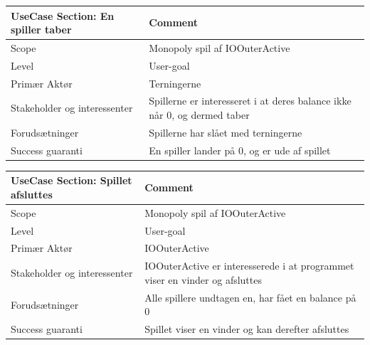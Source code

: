\begin{center}
\begin{tabular}{ | m{10em} | m{10cm}| }
        \hline
            UseCase Section: En spiller taber & Comment\\
        \hline
            Scope & Monopoly spil af IOOuterActive\\
        \hline
            Level & User-goal\\
        \hline
            Primær Aktør & Terningerne\\
        \hline
            Stakeholder og interessenter & Spillerne er interesseret i at deres balance ikke når 0, og dermed taber\\
        \hline
            Forudsætninger & Spillerne har slået med terningerne\\
        \hline
            Success guaranti & En spiller lander på 0, og er ude af spillet\\
        \hline
    \end{tabular}
\end{center}

\begin{center}
\begin{tabular}{ | m{10em} | m{10cm}| }
        \hline
            UseCase Section: Spillet afsluttes & Comment\\
        \hline
            Scope & Monopoly spil af IOOuterActive\\
        \hline
            Level & User-goal\\
        \hline
            Primær Aktør & IOOuterActive\\
        \hline
            Stakeholder og interessenter & IOOuterActive er interesserede i at programmet viser en vinder og afsluttes\\
        \hline
            Forudsætninger & Alle spillere undtagen en, har fået en balance på 0\\
        \hline
            Success guaranti &Spillet viser en vinder og kan derefter afsluttes\\
        \hline
    \end{tabular}
\end{center}
